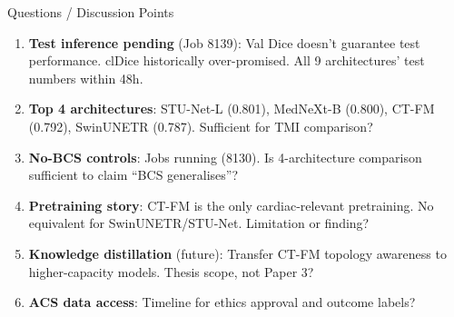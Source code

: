 \documentclass[aspectratio=169,10pt]{beamer}
\begin{document}
\begin{frame}{Questions / Discussion Points}

\begin{enumerate}
    \item \textbf{Test inference pending} (Job 8139): Val Dice doesn't guarantee test performance. clDice historically over-promised. All 9 architectures' test numbers within 48h.

    \item \textbf{Top 4 architectures}: STU-Net-L (0.801), MedNeXt-B (0.800), CT-FM (0.792), SwinUNETR (0.787). Sufficient for TMI comparison?

    \item \textbf{No-BCS controls}: Jobs running (8130). Is 4-architecture comparison sufficient to claim ``BCS generalises''?

    \item \textbf{Pretraining story}: CT-FM is the only cardiac-relevant pretraining. No equivalent for SwinUNETR/STU-Net. Limitation or finding?

    \item \textbf{Knowledge distillation} (future): Transfer CT-FM topology awareness to higher-capacity models. Thesis scope, not Paper 3?

    \item \textbf{ACS data access}: Timeline for ethics approval and outcome labels?
\end{enumerate}

\end{frame}
\end{document}
